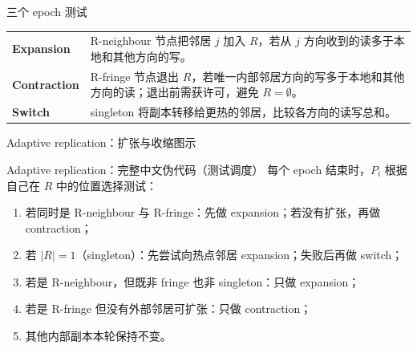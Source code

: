 \documentclass[UTF8,fontset=none,aspectratio=169,10pt]{beamer}
\begin{document}
{\begin{frame}{三个 epoch 测试}
\begin{tabularx}{\linewidth}{>{\bfseries}p{2.6cm}X}
\toprule
Expansion & R-neighbour 节点把邻居 $j$ 加入 $R$，若从 $j$ 方向收到的读多于本地和其他方向的写。 \\
Contraction & R-fringe 节点退出 $R$，若唯一内部邻居方向的写多于本地和其他方向的读；退出前需获许可，避免 $R=\emptyset$。 \\
Switch & singleton 将副本转移给更热的邻居，比较各方向的读写总和。 \\
\bottomrule
\end{tabularx}
\vfill
{}
\end{frame}

\begin{frame}{Adaptive replication：扩张与收缩图示}
\begin{center}
\end{center}
\end{frame}

\begin{frame}{Adaptive replication：完整中文伪代码（测试调度）}
\small
每个 epoch 结束时，$P_i$ 根据自己在 $R$ 中的位置选择测试：
\begin{enumerate}
  \item 若同时是 R-neighbour 与 R-fringe：先做 expansion；若没有扩张，再做 contraction；
  \item 若 $|R|=1$（singleton）：先尝试向热点邻居 expansion；失败后再做 switch；
  \item 若是 R-neighbour，但既非 fringe 也非 singleton：只做 expansion；
  \item 若是 R-fringe 但没有外部邻居可扩张：只做 contraction；
  \item 其他内部副本本轮保持不变。
\end{enumerate}
\vfill
{}
\end{frame}

}
\end{document}
